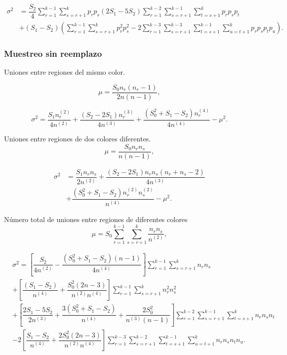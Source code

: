 \begin{align}
\sigma^2 &= \dfrac{S_2}{4} \sum_{r=1}^{k-1} \sum_{s=r+1}^{k} p_r p_s (2S_1-5S_2) \sum_{r=1}^{k-2} \sum_{s=r+1}^{k-1} \sum_{t=s+1}^{k} p_r p_s p_t \\ \nonumber
          & + (S_1-S_2)\left(\sum_{r=1}^{k-1} \sum_{s=r+1}^{k} p_r^2 p_s^2 - 2  \sum_{r=1}^{k-3} \sum_{s=r+1}^{k-3} \sum_{t=s+1}^{k-1} \sum_{u=t+1}^{k}p_r p_s p_t p_u \right) . 
\end{align}

\subsubsection*{Muestreo sin reemplazo}
Uniones entre regiones del mismo color.

\begin{equation}
\mu = \dfrac{S_0n_r(n_r-1)}{2n(n-1)} ,
\end{equation}

\begin{equation}
\sigma^2 = \dfrac{S_1n_r^{(2)}}{4n^{(2)}} + \dfrac{(S_2-2S_1)n_r^{(3)}}{4n^{(3)}} + \dfrac{(S_0^2+S_1-S_2)n_r^{(4)}}{4n^{(4)}}-\mu^2 .
\end{equation}

Uniones entre regiones de dos colores diferentes.
\begin{equation}
\mu = \dfrac{S_0n_r n_s}{n(n-1)},
\end{equation}

\begin{align}
\sigma^2 &=\dfrac{S_1 n_r n_s}{2n^{(2)}} +  \dfrac{(S_2-2S_1)n_r n_s(n_r+n_s-2)}{4n^{(3)}} \\ \nonumber
         &+ \dfrac{(S_0^2+S_1-S_2)n_r^{(2)}n_s^{(2)}}{n^{(4)}}-\mu^2 .
\end{align}

Número total de uniones entre regiones de diferentes colores
\begin{equation}
\mu = S_0 \sum_{r=1}^{k-1} \sum_{s=r+1}^{k} \dfrac{n_r n_s}{n^{(2)}},
\end{equation}

\begin{align}
&\sigma^2 = \left[ \dfrac{S_2}{4n^{(2)}} - \dfrac{(S_0^2 + S_1 - S_2)(n-1)}{4n^{(4)}} \right]\sum_{r=1}^{k-1} \sum_{s=r+1}^{k} n_r n_s \\ \nonumber
        & + \left[ \dfrac{(S_1 - S_2)}{n^{(4)}} + \dfrac{S_0^2(2n-3)}{n^{(2)}n^{(4)}} \right] \sum_{r=1}^{k-1} \sum_{s=r+1}^{k} n_r^2 n_s^2 \\ \nonumber
        & + \left[ \dfrac{2S_1 - 5S_2}{2n^{(3)}} + \dfrac{3(S_0^2+S_1-S_2)}{n^{(4)}} + \dfrac{2S_0^2}{n^{(3)}(n-1)} \right] \sum_{r=1}^{k-2} \sum_{s=r+1}^{k-1} \sum_{t=s+1}^{k} n_r n_s n_t  \\ \nonumber
        & - 2 \left[ \dfrac{S_1-S_2}{n^{(4)}}+ \dfrac{2S_0^2(2n-3)}{n^{(2)}n^{(4)}} \right]  \sum_{r=1}^{k-3} \sum_{s=r+1}^{k-2} \sum_{t=s+1}^{k-1} \sum_{u=t+1}^{k}n_r n_s n_t n_u . 
\end{align}


